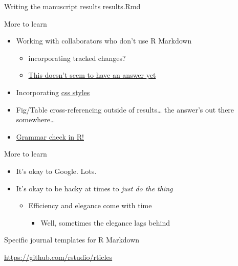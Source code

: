 \documentclass[
  ignorenonframetext,
]{beamer}
\providecommand{\tightlist}{%
  \setlength{\itemsep}{0pt}\setlength{\parskip}{0pt}}
\begin{document}
\begin{frame}[fragile]{Writing the manuscript results \textbar{}
results.Rmd}
\begin{block}{More to learn}
\begin{itemize}
  \begin{itemize}
  \tightlist
  \item
    Author affiliations
  \item
    Abstract, keywords, etc
  \end{itemize}
\item
  Working with collaborators who don't use R Markdown

  \begin{itemize}
  \tightlist
  \item
    incorporating tracked changes?
  \item
    \href{https://stackoverflow.com/questions/35945728/ms-word-track-changes-and-rmarkdown}{This
    doesn't seem to have an answer yet}
  \end{itemize}
\item
  Incorporating
  \href{https://rmarkdown.rstudio.com/html_document_format.html\#custom_css}{css
  styles}
\item
  Fig/Table cross-referencing outside of results\ldots{} the answer's
  out there somewhere\ldots{}
\item
  \href{https://github.com/ropenscilabs/gramr}{Grammar check in R!}
\end{itemize}

\end{block}

\begin{block}{More to learn}

\begin{itemize}
\tightlist
\item
  It's okay to Google. Lots.
\item
  It's okay to be hacky at times to \emph{just do the thing}

  \begin{itemize}
  \tightlist
  \item
    Efficiency and elegance come with time

    \begin{itemize}
    \tightlist
    \item
      Well, sometimes the elegance lags behind
    \end{itemize}
  \end{itemize}
\end{itemize}

\end{block}

\begin{block}{Specific journal templates for R Markdown}

\url{https://github.com/rstudio/rticles}

\end{block}

\end{frame}
\end{document}
